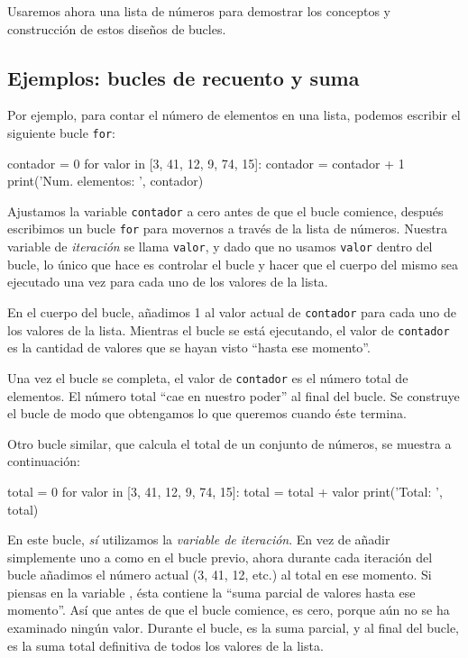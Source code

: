 Usaremos ahora una lista de números para demostrar los conceptos y
construcción de estos diseños de bucles.

\hypertarget{bucles-de-recuento-y-suma}{%
\subsection{Ejemplos: bucles de recuento y
suma}\label{bucles-de-recuento-y-suma}}

Por ejemplo, para contar el número de elementos en una lista, podemos
escribir el siguiente bucle \texttt{for}:

\begin{python}[frame=single]
contador = 0
for valor in [3, 41, 12, 9, 74, 15]:
    contador = contador + 1
print('Num. elementos: ', contador)
\end{python}

Ajustamos la variable \texttt{contador} a cero antes de que el bucle
comience, después escribimos un bucle \texttt{for} para movernos a
través de la lista de números. Nuestra variable de \emph{iteración} se
llama \texttt{valor}, y dado que no usamos \texttt{valor} dentro del
bucle, lo único que hace es controlar el bucle y hacer que el cuerpo del
mismo sea ejecutado una vez para cada uno de los valores de la lista.

En el cuerpo del bucle, añadimos 1 al valor actual de \texttt{contador}
para cada uno de los valores de la lista. Mientras el bucle se está
ejecutando, el valor de \texttt{contador} es la cantidad de valores que
se hayan visto ``hasta ese momento''.

Una vez el bucle se completa, el valor de \texttt{contador} es el número
total de elementos. El número total ``cae en nuestro poder'' al final
del bucle. Se construye el bucle de modo que obtengamos lo que queremos
cuando éste termina.

Otro bucle similar, que calcula el total de un conjunto de números, se
muestra a continuación:

\begin{python}[frame=single]
total = 0
for valor in [3, 41, 12, 9, 74, 15]:
    total = total + valor
print('Total: ', total)
\end{python}

En este bucle, \emph{sí} utilizamos la \emph{variable de iteración}. En
vez de añadir simplemente uno a  como en el bucle
previo, ahora durante cada iteración del bucle añadimos el número actual
(3, 41, 12, etc.) al total en ese momento. Si piensas en la variable
, ésta contiene la ``suma parcial de valores hasta ese
momento''. Así que antes de que el bucle comience,  es
cero, porque aún no se ha examinado ningún valor. Durante el bucle,
 es la suma parcial, y al final del bucle, 
es la suma total definitiva de todos los valores de la lista.

